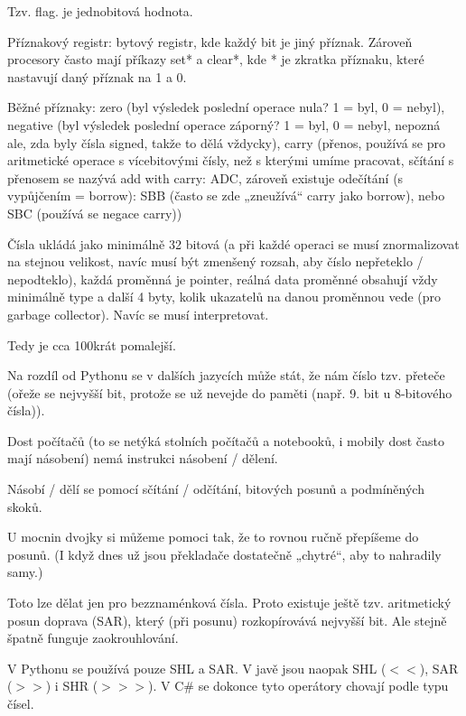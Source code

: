 \documentclass[12pt]{article}					%
\begin{document}

        \begin{definice}[Příznak]
            Tzv. flag. je jednobitová hodnota.

            Příznakový registr: bytový registr, kde každý bit je jiný příznak. Zároveň procesory často mají příkazy set* a clear*, kde * je zkratka příznaku, které nastavují daný příznak na 1 a 0.

            Běžné příznaky: zero (byl výsledek poslední operace nula? 1 = byl, 0 = nebyl), negative (byl výsledek poslední operace záporný? 1 = byl, 0 = nebyl, nepozná ale, zda byly čísla signed, takže to dělá vždycky), carry (přenos, používá se pro aritmetické operace s vícebitovými čísly, než s kterými umíme pracovat, sčítání s přenosem se nazývá add with carry: ADC, zároveň existuje odečítání (s vypůjčením = borrow): SBB (často se zde „zneužívá“ carry jako borrow), nebo SBC (používá se negace carry))
        \end{definice}

        
        \begin{poznamka}
            Čísla ukládá jako minimálně 32 bitová (a při každé operaci se musí znormalizovat na stejnou velikost, navíc musí být zmenšený rozsah, aby číslo nepřeteklo / nepodteklo), každá proměnná je pointer, reálná data proměnné obsahují vždy minimálně type a další 4 byty, kolik ukazatelů na danou proměnnou vede (pro garbage collector). Navíc se musí interpretovat.

            Tedy je cca 100krát pomalejší.
        \end{poznamka}

        \begin{poznamka}
            Na rozdíl od Pythonu se v dalších jazycích může stát, že nám číslo tzv. přeteče (ořeže se nejvyšší bit, protože se už nevejde do paměti (např. 9. bit u 8-bitového čísla)).
        \end{poznamka}

        \begin{poznamka}[Násobení]
            Dost počítačů (to se netýká stolních počítačů a notebooků, i mobily dost často mají násobení) nemá instrukci násobení / dělení.

            Násobí / dělí se pomocí sčítání / odčítání, bitových posunů a podmíněných skoků.

            U mocnin dvojky si můžeme pomoci tak, že to rovnou ručně přepíšeme do posunů. (I když dnes už jsou překladače dostatečně „chytré“, aby to nahradily samy.)
            \begin{upozorneni}
                Toto lze dělat jen pro bezznaménková čísla. Proto existuje ještě tzv. aritmetický posun doprava (SAR), který (při posunu) rozkopírovává nejvyšší bit. Ale stejně špatně funguje zaokrouhlování.

                V Pythonu se používá pouze SHL a SAR. V javě jsou naopak SHL ($<<$), SAR ($>>$) i SHR ($>>>$). V C\# se dokonce tyto operátory chovají podle typu čísel.
            \end{upozorneni}
        \end{poznamka}
\end{document}
